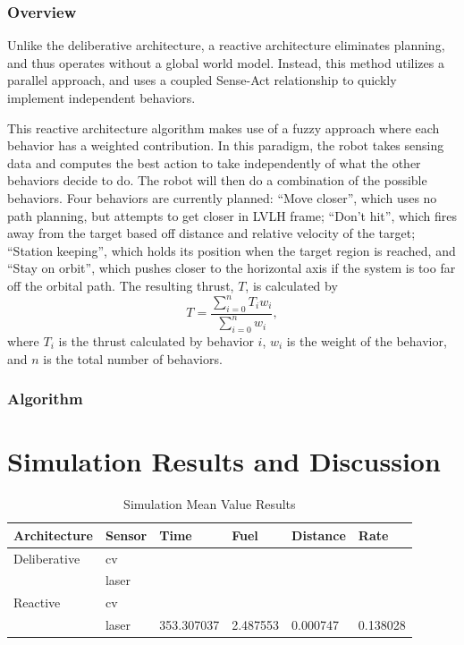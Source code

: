 \documentclass[journal, 10pt]{IEEEtran}
\begin{document}
\subsubsection{Overview}
Unlike the deliberative architecture, a reactive architecture eliminates planning, and thus operates without a global world model. Instead, this method utilizes a parallel approach, and uses a coupled Sense-Act relationship to quickly implement independent behaviors\cite{joshi}. 

This reactive architecture algorithm makes use of a fuzzy approach where each behavior has a weighted contribution. In this paradigm, the robot takes sensing data and computes the best action to take independently of what the other behaviors decide to do. The robot will then do a combination of the possible behaviors. Four behaviors are currently planned: ``Move closer'', which uses no path planning, but attempts to get closer in LVLH frame; ``Don't hit'', which fires away from the target based off distance and relative velocity of the target; ``Station keeping'', which holds its position when the target region is reached, and ``Stay on orbit'', which pushes closer to the horizontal axis if the system is too far off the orbital path. The resulting thrust, $T$, is calculated by
\begin{equation}
T = \frac{ \sum^{n}_{i=0} T_i w_i} { \sum^{n}_{i=0} w_i },
\end{equation}
where $T_i$ is the thrust calculated by behavior $i$, $w_i$ is the weight of the behavior, and $n$ is the total number of behaviors.

\subsubsection{Algorithm}


\section{Simulation Results and Discussion} \label{discuss}

\begin{table}
\centering
\normalsize
\caption{Simulation Mean Value Results}
\begin{tabular}{llllll}
\toprule
Architecture & Sensor & Time & Fuel & Distance & Rate \\
\midrule
Deliberative & cv \\
			& laser \\
Reactive & cv \\
& laser &  353.307037 &    2.487553 &  0.000747 &  0.138028 \\
\bottomrule
\end{tabular}
\label{mean}
\end{table}
\end{document}
